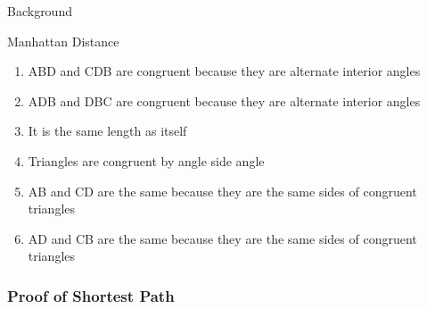 \documentclass{beamer}
\begin{document}
\begin{section}{Background}
\begin{subsection}{Manhattan Distance}
\begin{frame}
{\begin{enumerate}
                \begin{itemize}
                    \item  DB is a transversal of both sets of parallel lines
                \end{itemize}
            \item ABD and CDB are congruent because they are alternate interior angles
            \item ADB and DBC are congruent because they are alternate interior angles
            \item It is the same length as itself
            \item Triangles are congruent by angle side angle
            \item AB and CD are the same because they are the same sides of congruent triangles
            \item AD and CB are the same because they are the same sides of congruent triangles
        \end{enumerate}
    }
\end{frame}

\begin{frame}
    \frametitle{Proof of Shortest Path}
\end{frame}

\end{subsection}


\end{section}
\end{document}
